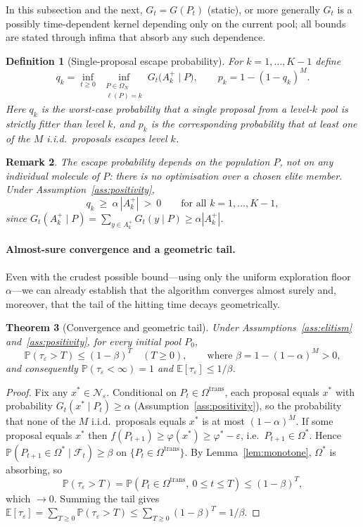 \documentclass[11pt,a4paper]{article}
\newtheorem{theorem}{Theorem}[section]
\newtheorem{definition}[theorem]{Definition}
\newtheorem{remark}[theorem]{Remark}
\newcommand{\Omn}{\Omega_N}
\newcommand{\Oms}{\Omega^*}
\newcommand{\Omt}{\Omega^{\mathrm{trans}}}
\newcommand{\calF}{\mathcal{F}}
\newcommand{\E}{\mathbb{E}}
\newcommand{\Prob}{\mathbb{P}}
\newcommand{\phist}{\varphi^*}
\newcommand{\Neps}{\mathcal{N}_\varepsilon}
\newcommand{\Akp}{A_k^{+}}
\begin{document}
In this subsection and the next, $G_t=G(P_t)$ (static), or more generally
$G_t$ is a possibly time-dependent kernel depending only on the current
pool; all bounds are stated through infima that absorb any such
dependence.

\begin{definition}[Single-proposal escape probability]\label{def:qk}
  For $k=1,\dots,K-1$ define
  \[
    q_k=\inf_{t\ge0}\ \inf_{\substack{P\in\Omn\\\ell(P)=k}}
        G_t\!\bigl(\Akp\mid P\bigr),
    \qquad
    p_k=1-(1-q_k)^M .
  \]
  Here $q_k$ is the worst-case probability that a single proposal from a
  level-$k$ pool is strictly fitter than level $k$, and $p_k$ is the
  corresponding probability that at least one of the $M$ i.i.d.\
  proposals escapes level $k$.
\end{definition}

\begin{remark}
  The escape probability depends on the \emph{population} $P$, not on any
  individual molecule of $P$: there is no optimisation over a chosen
  elite member.  Under Assumption~\ref{ass:positivity},
  \[
    q_k\ \ge\ \alpha\,|\Akp|\ >\ 0
    \qquad\text{for all }k=1,\dots,K-1,
  \]
  since $G_t(\Akp\mid P)=\sum_{y\in\Akp}G_t(y\mid P)\ge\alpha|\Akp|$.
\end{remark}

\paragraph{Almost-sure convergence and a geometric tail.}

Even with the crudest possible bound---using only the uniform exploration
floor $\alpha$---we can already establish that the algorithm converges
almost surely and, moreover, that the tail of the hitting time decays
geometrically.

\begin{theorem}[Convergence and geometric tail]\label{thm:base-conv}
  Under Assumptions~\ref{ass:elitism} and~\ref{ass:positivity}, for
  every initial pool $P_0$,
  \[
    \Prob(\tau_\varepsilon>T)\le(1-\beta)^T\quad(T\ge0),
    \qquad\text{where }\beta=1-(1-\alpha)^M>0,
  \]
  and consequently $\Prob(\tau_\varepsilon<\infty)=1$ and
  $\E[\tau_\varepsilon]\le1/\beta$.
\end{theorem}

\begin{proof}
  Fix any $x^*\in\Neps$.  Conditional on $P_t\in\Omt$, each proposal
  equals $x^*$ with probability $G_t(x^*\mid P_t)\ge\alpha$
  (Assumption~\ref{ass:positivity}), so the probability that none of the
  $M$ i.i.d.\ proposals equals $x^*$ is at most $(1-\alpha)^M$.  If some
  proposal equals $x^*$ then $f(P_{t+1})\ge\varphi(x^*)\ge\phist-\varepsilon$,
  i.e.\ $P_{t+1}\in\Oms$.  Hence
  $\Prob(P_{t+1}\in\Oms\mid\calF_t)\ge\beta$ on $\{P_t\in\Omt\}$.  By
  Lemma~\ref{lem:monotone}, $\Oms$ is absorbing, so
  \[
    \Prob(\tau_\varepsilon>T)
    =\Prob(P_t\in\Omt,\ 0\le t\le T)
    \le(1-\beta)^T,
  \]
  which $\to0$.  Summing the tail gives $\E[\tau_\varepsilon]=
  \sum_{T\ge0}\Prob(\tau_\varepsilon>T)\le\sum_{T\ge0}(1-\beta)^T=1/\beta$.
\end{proof}
\end{document}
